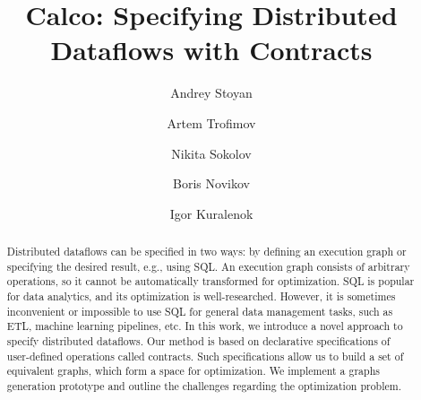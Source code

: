 \documentclass[sigconf]{acmart}
\theoremstyle{remark}
\begin{document}

\title{Calco: Specifying Distributed Dataflows with Contracts }

\author{Andrey Stoyan}

\author{Artem Trofimov}

\author{Nikita Sokolov}

\author{Boris Novikov}

\author{Igor Kuralenok}

\begin{abstract}
    Distributed dataflows can be specified in two ways: by defining an execution graph or specifying the desired result, e.g., using SQL.
    An execution graph consists of arbitrary operations, so it cannot be automatically transformed for optimization.
    SQL is popular for data analytics, and its optimization is well-researched.
    However, it is sometimes inconvenient or impossible to use SQL for general data management tasks, such as ETL, machine learning pipelines, etc.
    In this work, we introduce a novel approach to specify distributed dataflows.
    Our method is based on declarative specifications of user-defined operations called contracts.
    Such specifications allow us to build a set of equivalent graphs, which form a space for optimization.
    We implement a graphs generation prototype and outline the challenges regarding the optimization problem.
\end{abstract}
\end{document}
